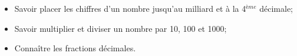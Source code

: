 \begin{myobj}
	\begin{itemize}
		\item Savoir placer les chiffres d'un nombre jusqu'au milliard et à la 4$^{ème}$ décimale;
		\item Savoir multiplier et diviser un nombre par 10, 100 et 1000;
		\item Connaître les fractions décimales.		
	\end{itemize}
\end{myobj}